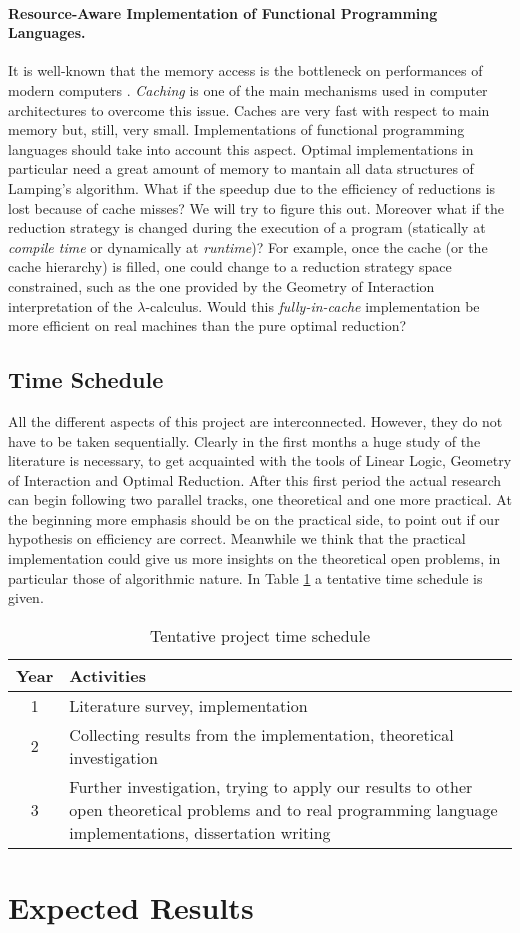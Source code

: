 \documentclass[english]{scrartcl}
\begin{document}
\paragraph{Resource-Aware Implementation of Functional Programming Languages.}It is well-known that the memory access is the bottleneck on performances of modern computers \cite{hennessy_computer_2011}. \emph{Caching} is one of the main mechanisms used in computer architectures to overcome this issue. Caches are very fast with respect to main memory but, still, very small. Implementations of functional programming languages should take into account this aspect. Optimal implementations in particular need a great amount of memory to mantain all data structures of Lamping's algorithm. What if the speedup due to the efficiency of reductions is lost because of cache misses? We will try to figure this out. Moreover what if the reduction strategy is changed during the execution of a program (statically at \emph{compile time} or dynamically at \emph{runtime})? For example, once the cache (or the cache hierarchy) is filled, one could change to a reduction strategy space constrained, such as the one provided by the Geometry of Interaction interpretation of the $\lambda$-calculus. Would this \emph{fully-in-cache} implementation be more efficient on real machines than the pure optimal reduction?
\subsection*{Time Schedule}All the different aspects of this project are interconnected. However, they do not have to be taken sequentially. Clearly in the first months a huge study of the literature is necessary, to get acquainted with the tools of Linear Logic, Geometry of Interaction and Optimal Reduction. After this first period the actual research can begin following two parallel tracks, one theoretical and one more practical. At the beginning more emphasis should be on the practical side, to point out if our hypothesis on efficiency are correct. Meanwhile we think that the practical implementation could give us more insights on the theoretical open problems, in particular those of algorithmic nature. In Table \ref{table:schedule} a tentative time schedule is given.
\begin{table}[h]
	\centering
	\begin{tabular}{|c|>{\raggedright}m{10cm}|}
		\hline 
		\textbf{Year} & \textbf{Activities}\tabularnewline
		\hline 
		\hline 
		1 & Literature survey, implementation\tabularnewline
		\hline 
		2 & Collecting results from the implementation, theoretical investigation \tabularnewline
		\hline 
		3 & Further investigation, trying to apply our results to other open theoretical problems and to real programming language implementations, dissertation writing \tabularnewline
		\hline 
	\end{tabular}
	\caption{Tentative project time schedule}
	\label{table:schedule}
\end{table}
\section{Expected Results}


\end{document}
